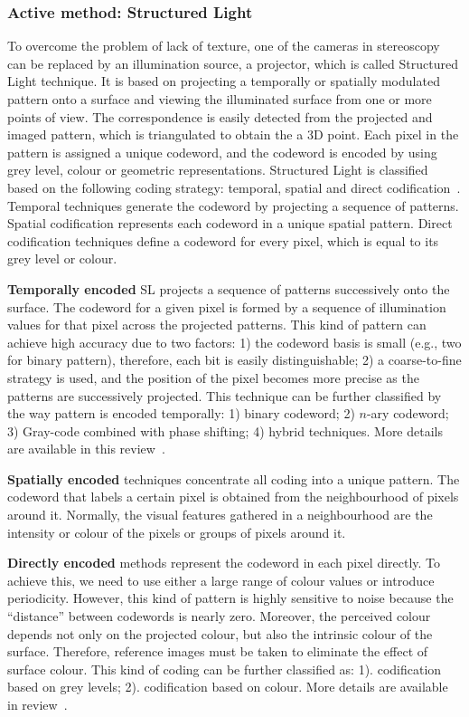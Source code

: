 \subsubsection{Active method: Structured Light}
To overcome the problem of lack of texture, one of the cameras in stereoscopy can be replaced by an illumination source, \eg a projector, which is called Structured Light technique. It is based on projecting a temporally or spatially modulated pattern onto a surface and viewing the illuminated surface from one or more points of view. The correspondence is easily detected from the projected and imaged pattern, which is triangulated to obtain the a 3D point. Each pixel in the pattern is assigned a unique codeword, and the codeword is encoded by using grey level, colour or geometric representations. Structured Light is classified based on the following coding strategy: temporal, spatial and direct codification~\cite{salvi2004pattern}. Temporal techniques generate the codeword by projecting a sequence of patterns. Spatial codification represents each codeword in a unique spatial pattern. Direct codification techniques define a codeword for every pixel, which is equal to its grey level or colour.

\textbf{Temporally encoded} SL projects a sequence of patterns successively onto the surface. The codeword for a given pixel is formed by a sequence of illumination values for that pixel across the projected patterns. This kind of pattern can achieve high accuracy due to two factors: 1) the codeword basis is small (e.g., two for binary pattern), therefore, each bit is easily distinguishable; 2) a coarse-to-fine strategy is used, and the position of the pixel becomes more precise as the patterns are successively projected. This technique can be further classified by the way pattern is encoded temporally: 1) binary codeword; 2) $n$-ary codeword; 3) Gray-code combined with phase shifting; 4) hybrid techniques. More details are available in this review~\cite{salvi2004pattern}.

\textbf{Spatially encoded} techniques concentrate all coding into a unique pattern. The codeword that labels a certain pixel is obtained from the neighbourhood of pixels around it. Normally, the visual features gathered in a neighbourhood are the intensity or colour of the pixels or groups of pixels around it.

\textbf{Directly encoded} methods represent the codeword in each pixel directly. To achieve this, we need to use either a large range of colour values or introduce periodicity. However, this kind of pattern is highly sensitive to noise because the ``distance'' between codewords is nearly zero. Moreover, the perceived colour depends not only on the projected colour, but also the intrinsic colour of the surface. Therefore, reference images must be taken to eliminate the effect of surface colour. This kind of coding can be further classified as: 1). codification based on grey levels; 2). codification based on colour. More details are available in review~\cite{salvi2004pattern}.

